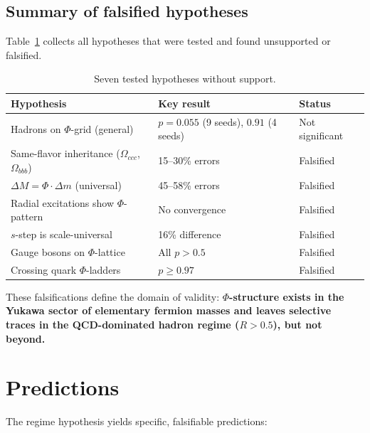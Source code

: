 \documentclass[11pt,a4paper]{article}
\begin{document}
\subsection{Summary of falsified hypotheses}
\label{sec:falsified}

Table~\ref{tab:falsified} collects all hypotheses that were tested and
found unsupported or falsified.

\begin{table}[H]
\centering
\caption{Seven tested hypotheses without support.}
\label{tab:falsified}
\begin{tabular}{@{}lll@{}}
\toprule
Hypothesis & Key result & Status \\
\midrule
Hadrons on $\Phi$-grid (general)        & $p = 0.055$ (9 seeds), $0.91$ (4 seeds) & Not significant \\
Same-flavor inheritance ($\Omega_{ccc}$, $\Omega_{bbb}$)
                                         & 15--30\% errors  & Falsified \\
$\Delta M = \Phi \cdot \Delta m$ (universal)
                                         & 45--58\% errors  & Falsified \\
Radial excitations show $\Phi$-pattern   & No convergence   & Falsified \\
$s$-step is scale-universal              & 16\% difference  & Falsified \\
Gauge bosons on $\Phi$-lattice           & All $p > 0.5$    & Falsified \\
Crossing quark $\Phi$-ladders            & $p \geq 0.97$    & Falsified \\
\bottomrule
\end{tabular}
\end{table}

\noindent
These falsifications define the domain of validity:
\textbf{$\Phi$-structure exists in the Yukawa sector of elementary
fermion masses and leaves selective traces in the QCD-dominated hadron
regime ($R > 0.5$), but not beyond.}

\section{Predictions}
\label{sec:predictions}

The regime hypothesis yields specific, falsifiable predictions:
\end{document}
